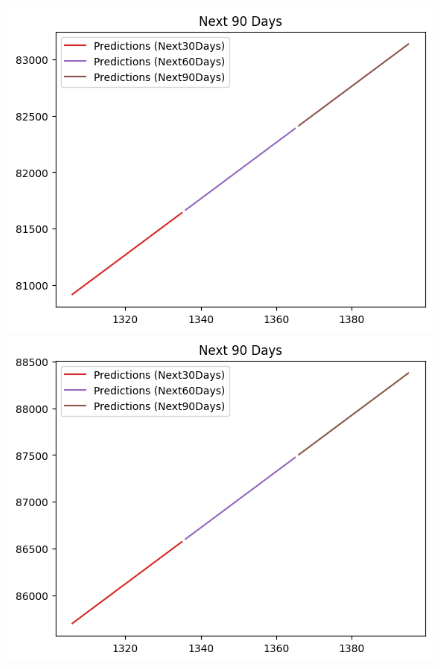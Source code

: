 \begin{figure}[H]
\begin{minipage}{0.15\textwidth}
    \centering
    \includegraphics[width=1\textwidth]{resources/chapter-5/newdata1/predicted/VCB_LinearRegression_8-2_90Days.png}
    \end{minipage}
    \hfill
        \begin{minipage}{0.15\textwidth}
    \centering
    \includegraphics[width=1\textwidth]{resources/chapter-5/newdata1/predicted/VCB_LinearRegression_9-1_90Days.png}
    \end{minipage}
    \hfill
    \begin{minipage}{0.15\textwidth}
    \centering

\end{minipage}
\end{figure}

